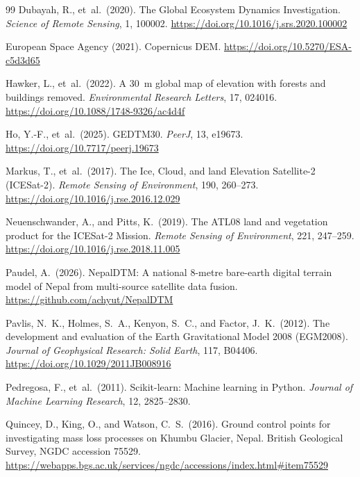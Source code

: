 \documentclass[11pt]{article}
\begin{document}
\begin{thebibliography}{99}
Dubayah, R., et~al.\ (2020).
The Global Ecosystem Dynamics Investigation.
\textit{Science of Remote Sensing}, 1, 100002.
\url{https://doi.org/10.1016/j.srs.2020.100002}

European Space Agency (2021).
Copernicus DEM.
\url{https://doi.org/10.5270/ESA-c5d3d65}

Hawker, L., et~al.\ (2022).
A 30~m global map of elevation with forests and buildings removed.
\textit{Environmental Research Letters}, 17, 024016.
\url{https://doi.org/10.1088/1748-9326/ac4d4f}

Ho, Y.-F., et~al.\ (2025).
GEDTM30.
\textit{PeerJ}, 13, e19673.
\url{https://doi.org/10.7717/peerj.19673}

Markus, T., et~al.\ (2017).
The Ice, Cloud, and land Elevation Satellite-2 (ICESat-2).
\textit{Remote Sensing of Environment}, 190, 260--273.
\url{https://doi.org/10.1016/j.rse.2016.12.029}

Neuenschwander, A., and Pitts, K.\ (2019).
The ATL08 land and vegetation product for the ICESat-2 Mission.
\textit{Remote Sensing of Environment}, 221, 247--259.
\url{https://doi.org/10.1016/j.rse.2018.11.005}

Paudel, A.\ (2026).
NepalDTM: A national 8-metre bare-earth digital terrain model of Nepal from multi-source satellite data fusion.
\url{https://github.com/achyut/NepalDTM}

Pavlis, N.~K., Holmes, S.~A., Kenyon, S.~C., and Factor, J.~K.\ (2012).
The development and evaluation of the Earth Gravitational Model 2008 (EGM2008).
\textit{Journal of Geophysical Research: Solid Earth}, 117, B04406.
\url{https://doi.org/10.1029/2011JB008916}

Pedregosa, F., et~al.\ (2011).
Scikit-learn: Machine learning in Python.
\textit{Journal of Machine Learning Research}, 12, 2825--2830.

Quincey, D., King, O., and Watson, C.~S.\ (2016).
Ground control points for investigating mass loss processes on Khumbu Glacier, Nepal.
British Geological Survey, NGDC accession 75529.
\url{https://webapps.bgs.ac.uk/services/ngdc/accessions/index.html#item75529}


\end{thebibliography}
\end{document}
